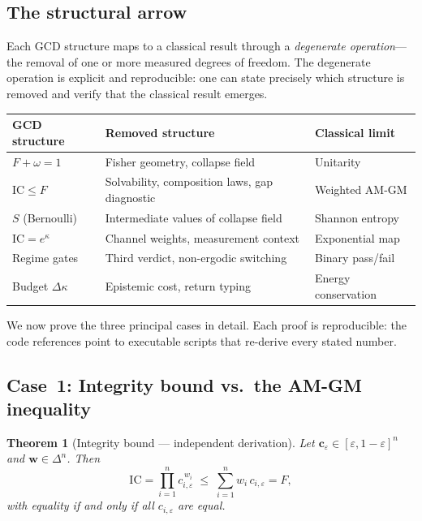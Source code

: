 \documentclass[
  aps,
  prd,
  twocolumn,
  superscriptaddress,
  nofootinbib,
  floatfix
]{revtex4-2}
\newtheorem{theorem}{Theorem}
\newcommand{\eps}{\varepsilon}
\newcommand{\beq}{\begin{equation}}
\newcommand{\eeq}{\end{equation}}
\newcommand{\tvec}{\mathbf{c}}
\newcommand{\wvec}{\mathbf{w}}
\newcommand{\IC}{\mathrm{IC}}
\begin{document}
\subsection{The structural arrow}

Each GCD structure maps to a classical result through a
\emph{degenerate operation}---the removal of one or more
measured degrees of freedom.  The degenerate operation is
explicit and reproducible: one can state precisely which
structure is removed and verify that the classical result
emerges.

{\small
\begin{center}
\begin{tabular}{@{}P{2.1cm}P{2.1cm}P{2.8cm}@{}}
\toprule
GCD structure & Removed structure & Classical limit \\
\midrule
$F + \omega = 1$ &
  Fisher geometry, collapse field &
  Unitarity \\[0.3em]
$\IC \leq F$ &
  Solvability, composition laws, gap diagnostic &
  Weighted AM-GM \\[0.3em]
$S$ (Bernoulli) &
  Intermediate values of collapse field &
  Shannon entropy \\[0.3em]
$\IC = e^\kappa$ &
  Channel weights, measurement context &
  Exponential map \\[0.3em]
Regime gates &
  Third verdict, non-ergodic switching &
  Binary pass/fail \\[0.3em]
Budget $\Delta\kappa$ &
  Epistemic cost, return typing &
  Energy conservation \\
\bottomrule
\end{tabular}
\end{center}}

We now prove the three principal cases in detail.  Each proof
is reproducible: the code references point to executable
scripts that re-derive every stated number.

\subsection{Case~1: Integrity bound vs.\ the AM-GM inequality}

\begin{theorem}[Integrity bound --- independent derivation]
\label{thm:icf}
Let $\tvec_\eps \in [\eps, 1{-}\eps]^n$ and
$\wvec \in \Delta^n$.  Then
\beq
  \IC = \prod_{i=1}^n c_{i,\eps}^{\,w_i}
  \;\leq\;
  \sum_{i=1}^n w_i\, c_{i,\eps} = F,
\eeq
with equality if and only if all $c_{i,\eps}$ are equal.
\end{theorem}
\end{document}
